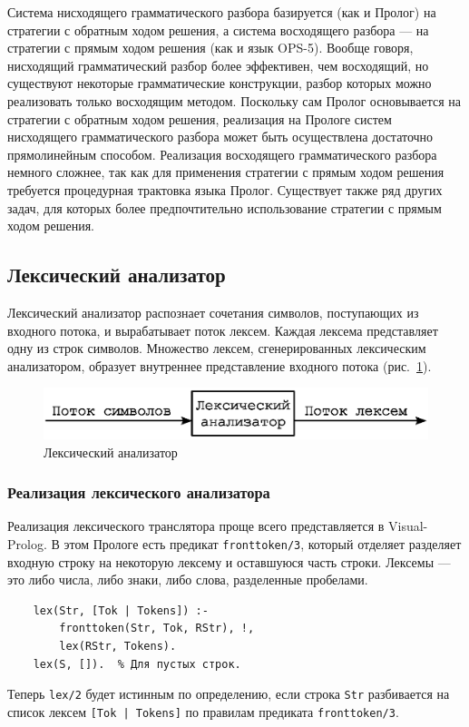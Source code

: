 \documentclass[12pt, openany, twoside]{book} %
\begin{document}
Система нисходящего грамматического разбора базируется (как и Пролог) на стратегии с обратным ходом решения, а система восходящего разбора --- на стратегии с прямым ходом решения (как и язык OPS-5). Вообще говоря, нисходящий грамматический разбор более эффективен, чем восходящий, но существуют некоторые грамматические конструкции, разбор которых можно реализовать только восходящим методом. Поскольку сам Пролог основывается на стратегии с обратным ходом решения, реализация на Прологе систем нисходящего грамматического разбора может быть осуществлена достаточно прямолинейным способом. Реализация восходящего грамматического разбора немного сложнее, так как для применения стратегии с прямым ходом решения требуется процедурная трактовка языка Пролог. Существует также ряд других задач, для которых более предпочтительно использование стратегии с прямым ходом решения.

\subsection{Лексический анализатор}

Лексический анализатор распознает сочетания символов, поступающих из входного потока, и вырабатывает поток лексем. Каждая лексема представляет одну из строк символов. Множество лексем, сгенерированных лексическим анализатором, образует внутреннее представление входного потока (рис.~\ref{pic:lex_anal}).

\begin{figure}[htbp]
\begin{center}
\includegraphics[scale=0.7]{pics/lex_anal.eps}
\end{center}
\caption{Лексический анализатор}\label{pic:lex_anal}
\end{figure}

\subsubsection{Реализация лексического анализатора}


Реализация лексического транслятора проще всего представляется в Visual-Prolog. В этом Прологе есть предикат  {\tt fronttoken/3}, который отделяет разделяет входную строку на некоторую лексему и оставшуюся часть строки. Лексемы --- это либо числа, либо знаки, либо слова, разделенные пробелами.
{\tt\begin{verbatim}
    lex(Str, [Tok | Tokens]) :-
        fronttoken(Str, Tok, RStr), !,
        lex(RStr, Tokens).
    lex(S, []).  % Для пустых строк.
\end{verbatim}}
\noindent Теперь {\tt lex/2} будет истинным по определению, если строка {\tt Str} разбивается на список лексем {\tt [Tok | Tokens]} по правилам предиката {\tt fronttoken/3}.
\end{document}
